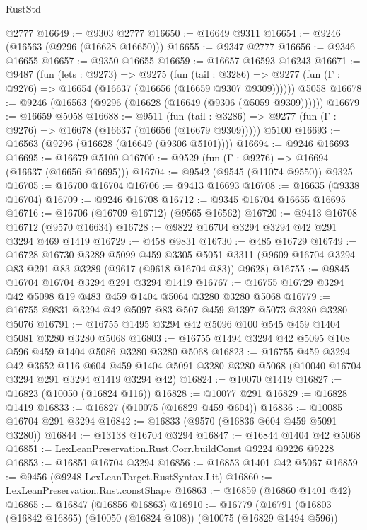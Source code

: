 \begin{lexlean}{RustStd}
\begin{coremodule}
    @2777
@16649 := @9303 @2777
@16650 := @16649 @9311
@16654 := @9246 (@16563 (@9296 (@16628 @16650)))
@16655 := @9347 @2777
@16656 := @9346 @16655
@16657 := @9350 @16655
@16659 := @16657 @16593 @16243
@16671 := @9487
    (fun (lets : @9273) =>
    @9275
      (fun (tail : @3286) =>
      @9277 (fun (Γ : @9276) => @16654 (@16637 (@16656 (@16659 @9307 @9309))))))
    @5058
@16678 := @9246 (@16563 (@9296 (@16628 (@16649 (@9306 (@5059 @9309))))))
@16679 := @16659 @5058
@16688 := @9511
    (fun (tail : @3286) => @9277 (fun (Γ : @9276) => @16678 (@16637 (@16656 (@16679 @9309)))))
    @5100
@16693 := @16563 (@9296 (@16628 (@16649 (@9306 @5101))))
@16694 := @9246 @16693
@16695 := @16679 @5100
@16700 := @9529 (fun (Γ : @9276) => @16694 (@16637 (@16656 @16695)))
@16704 := @9542 (@9545 (@11074 @9550)) @9325
@16705 := @16700 @16704
@16706 := @9413 @16693
@16708 := @16635 (@9338 @16704)
@16709 := @9246 @16708
@16712 := @9345 @16704 @16655 @16695
@16716 := @16706 (@16709 @16712) (@9565 @16562)
@16720 := @9413 @16708 @16712 (@9570 @16634)
@16728 := @9822 @16704 @3294 @3294 @42 @291 @3294 @469 @1419
@16729 := @458 @9831
@16730 := @485 @16729
@16749 := @16728
    @16730
    @3289
    @5099
    @459
    @3305
    @5051
    @3311
    (@9609 @16704 @3294 @83 @291 @83 @3289 (@9617 (@9618 @16704 @83)) @9628)
@16755 := @9845 @16704 @16704 @3294 @291 @3294 @1419
@16767 := @16755 @16729 @3294 @42 @5098 @19 @483 @459 @1404 @5064 @3280 @3280 @5068
@16779 := @16755 @9831 @3294 @42 @5097 @83 @507 @459 @1397 @5073 @3280 @3280 @5076
@16791 := @16755 @1495 @3294 @42 @5096 @100 @545 @459 @1404 @5081 @3280 @3280 @5068
@16803 := @16755 @1494 @3294 @42 @5095 @108 @596 @459 @1404 @5086 @3280 @3280 @5068
@16823 := @16755
    @459
    @3294
    @42
    @3652
    @116
    @604
    @459
    @1404
    @5091
    @3280
    @3280
    @5068
    (@10040 @16704 @3294 @291 @3294 @1419 @3294 @42)
@16824 := @10070 @1419
@16827 := @16823 (@10050 (@16824 @116))
@16828 := @10077 @291
@16829 := @16828 @1419
@16833 := @16827 (@10075 (@16829 @459 @604))
@16836 := @10085 @16704 @291 @3294
@16842 := @16833 (@9570 (@16836 @604 @459 @5091 @3280))
@16844 := @13138 @16704 @3294
@16847 := @16844 @1404 @42 @5068
@16851 := LexLeanPreservation.Rust.Corr.buildConst @9224 @9226 @9228
@16853 := @16851 @16704 @3294
@16856 := @16853 @1401 @42 @5067
@16859 := @9456 (@9248 LexLeanTarget.RustSyntax.Lit)
@16860 := LexLeanPreservation.Rust.constShape
@16863 := @16859 (@16860 @1401 @42)
@16865 := @16847 (@16856 @16863)
@16910 := @16779
    (@16791
      (@16803
        (@16842 @16865)
        (@10050 (@16824 @108))
        (@10075 (@16829 @1494 @596))

\end{coremodule}
\end{lexlean}
